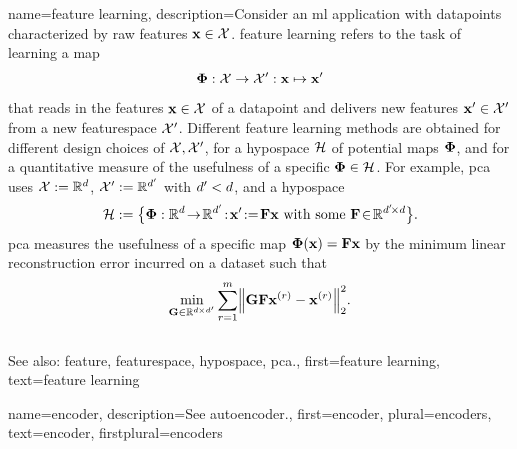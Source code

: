 {name={feature learning},
	description={Consider an \gls{ml} application with \glspl{datapoint} characterized by 
		raw \glspl{feature} ${\bf x} \in \mathcal{X}$. \Gls{feature} learning 
		refers to the task of learning a \gls{map} 
		$${\bf \Phi}: \mathcal{X} \rightarrow \mathcal{X}': {\bf x} \mapsto {\bf x}'$$ 
		that reads in the \glspl{feature} ${\bf x} \in \mathcal{X}$ of a \gls{datapoint} and delivers new 
		\glspl{feature} ${\bf x}' \in \mathcal{X}'$ from a new \gls{featurespace} $\mathcal{X}'$. 
		Different \gls{feature} learning methods are obtained for different design 
		choices of $\mathcal{X},\mathcal{X}'$, for a \gls{hypospace} $\mathcal{H}$ 
		of potential \glspl{map} ${\bf \Phi}$, and for a quantitative \gls{measure} of the usefulness of 
		a specific ${\bf \Phi} \in \mathcal{H}$. For example, \gls{pca} 
		uses $\mathcal{X} := \mathbb{R}^{d}$, $\mathcal{X}' := \mathbb{R}^{d'}$ 
		with $d' < d$, and a \gls{hypospace} 
		$$\hypospace\defeq \big\{ \featuremapvec: \mathbb{R}^{\dimlocalmodel}
		\!\rightarrow\! \mathbb{R}^{\dimlocalmodel'}\!:\!\featurevec'\!\defeq\!\mF \featurevec \mbox{ with some } \mF \!\in\! \mathbb{R}^{\dimlocalmodel' \!\times \dimlocalmodel} \big\}.$$ 
		\Gls{pca} measures the usefulness of a specific \gls{map} ${\bf \Phi}({\bf x})= \mathbf{F} {\bf x}$ 
		by the \gls{minimum} linear reconstruction error incurred on a \gls{dataset} such that 
		$$\min_{\mG \in \mathbb{R}^{\dimlocalmodel \!\!\!\times \dimlocalmodel'}} \sum_{\sampleidx=1}^{\samplesize} \normgeneric{\mG \mF \featurevec^{(\sampleidx)} - \featurevec^{(\sampleidx)}}{2}^{2}.$$ 
			\\ 
		See also: \gls{feature}, \gls{featurespace}, \gls{hypospace}, \gls{pca}.}, 
	first={feature learning},
	text={feature learning}
}

{name={encoder}, 
	description={See \gls{autoencoder}.}, 
 	first={encoder}, 
 	plural={encoders}, 
 	text={encoder}, 
 	firstplural={encoders}
}

